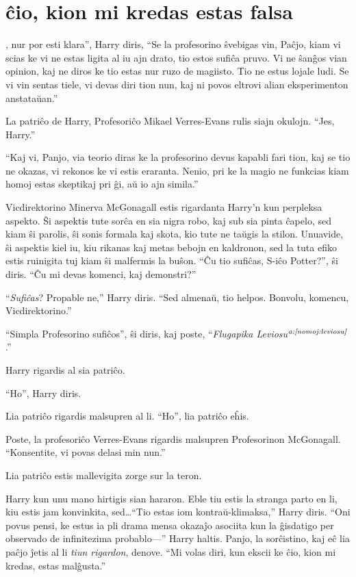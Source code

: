 \chapter{ĉio, kion mi kredas estas falsa}

, nur por esti klara'', Harry diris, ``Se la
profesorino ŝvebigas vin, Paĉjo, kiam vi scias ke vi ne estas ligita
al iu ajn drato, tio estos sufiĉa pruvo. Vi ne ŝanĝos vian opinion,
kaj ne diros ke tio estas nur ruzo de magiisto. Tio ne estus lojale
ludi. Se vi vin sentas tiele, vi devas diri tion nun, kaj ni povos
eltrovi alian eksperimenton anstataŭan.''

La patriĉo de Harry, Profesoriĉo Mikael Verres-Evans rulis siajn okulojn. ``Jes, Harry.''

``Kaj vi, Panjo, via teorio diras ke la profesorino devus kapabli
fari tion, kaj se tio ne okazas, vi rekonos ke vi estis
eraranta. Nenio, pri ke la magio ne funkcias kiam homoj estas
skeptikaj pri ĝi, aŭ io ajn simila.''

Vicdirektorino Minerva McGonagall estis rigardanta Harry'n kun
perpleksa aspekto. Ŝi aspektis tute sorĉa en sia nigra robo, kaj sub
sia pinta ĉapelo, sed kiam ŝi parolis, ŝi sonis formala kaj skota,
kio tute ne taŭgis la stilon.  Unuavide, ŝi aspektis kiel iu, kiu
rikanas kaj metas bebojn en kaldronon, sed la tuta efiko estis
ruinigita tuj kiam ŝi malfermis la buŝon. ``Ĉu tio sufiĉas,
S-iĉo Potter?'', ŝi diris. ``Ĉu mi devas komenci, kaj demonstri?''

``\emph{Sufiĉas}? Propable ne,'' Harry diris. ``Sed almenaŭ, tio helpos. Bonvolu, komencu, Vicdirektorino.''

``Simpla Profesorino sufiĉos'', ŝi diris, kaj poste, ``\emph{Flugapika Leviosu$^{\textit{a:\ref{nomoj:leviosu}}}$}.''

Harry rigardis al sia patriĉo.

``Ho'', Harry diris.

Lia patriĉo rigardis malsupren al li. ``Ho'', lia patriĉo eĥis.

Poste, la profesoriĉo Verres-Evans rigardis malsupren Profesorinon
McGonagall. ``Konsentite, vi povas delasi min nun.''

Lia patriĉo estis mallevigita zorge sur la teron.

Harry kun unu mano hirtigis sian hararon. Eble tiu estis la stranga
parto en li, kiu estis jam konvinkita, sed\ldots ``Tio estas iom
kontraŭ-klimaksa,'' Harry diris. ``Oni povus pensi, ke estus ia pli
drama mensa okazaĵo asociita kun la ĝisdatigo per observado de
infinitezima probablo—'' Harry haltis. Panjo, la sorĉistino, kaj eĉ
lia paĉjo ĵetis al li \emph{tiun rigardon}, denove. ``Mi volas diri,
kun ekscii ke ĉio, kion mi kredas, estas malĝusta.''

